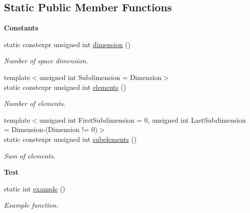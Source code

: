 \subsection*{Static Public Member Functions}
\begin{Indent}{\bf Constants}\par
\begin{DoxyCompactItemize}
\item 
static constexpr unsigned int \hyperlink{classmagrathea_1_1AbstractHyperCube_a9d9dbd803c06603fbd23058689f44cc7}{dimension} ()
\begin{DoxyCompactList}\small\item\em Number of space dimension. \end{DoxyCompactList}\item 
{\footnotesize template$<$unsigned int Subdimension = Dimension$>$ }\\static constexpr unsigned int \hyperlink{classmagrathea_1_1AbstractHyperCube_a72f398a8e3993826380cabc47aba7b8e}{elements} ()
\begin{DoxyCompactList}\small\item\em Number of elements. \end{DoxyCompactList}\item 
{\footnotesize template$<$unsigned int First\-Subdimension = 0, unsigned int Last\-Subdimension = Dimension-\/(\-Dimension != 0)$>$ }\\static constexpr unsigned int \hyperlink{classmagrathea_1_1AbstractHyperCube_aa681927fa1b4ae8e940c618740ce6394}{subelements} ()
\begin{DoxyCompactList}\small\item\em Sum of elements. \end{DoxyCompactList}\end{DoxyCompactItemize}
\end{Indent}
\begin{Indent}{\bf Test}\par
\begin{DoxyCompactItemize}
\item 
static int \hyperlink{classmagrathea_1_1AbstractHyperCube_a906538ea22de1d67f1c3cada11f8df6f}{example} ()
\begin{DoxyCompactList}\small\item\em Example function. \end{DoxyCompactList}\end{DoxyCompactItemize}
\end{Indent}
